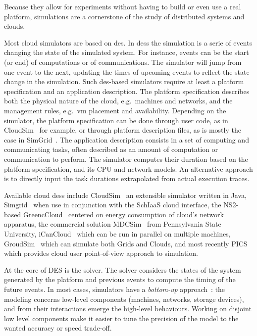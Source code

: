 \documentclass[10pt,conference,compsocconf]{IEEEtran}
\begin{document}
Because they allow for experiments without having to build or even use a real 
platform, simulations are a cornerstone of the study of distributed
systems and clouds.  

Most cloud simulators  are based on \ac{des}. In \aclp{des}  the simulation is a
serie  of events  changing the  state of  the simulated  system.  For  instance,
events can  be the  start (or  end) of computations  or of  communications.  The
simulator will jump from  one event to the next, updating  the times of upcoming
events  to reflect  the state  change  in the  simulation.  Such  \ac{des}-based
simulators  require  at  least  a  platform  specification  and  an  application
description.  The platform  specification describes both the  physical nature of
the cloud,  e.g.~machines and networks,  and the management  rules, e.g.~\ac{vm}
placement  and   availability.   Depending   on  the  simulator,   the  platform
specification can be done through  user code, as in CloudSim~\cite{cloudsim} for
example,  or through  platform  description  files, as  is  mostly  the case  in
SimGrid~\cite{simgrid}.   The  application  description  consists in  a  set  of
computing and communicating  tasks, often described as an  amount of computation
or communication to perform. The simulator  computes their duration based on the
platform specification, and its CPU and network models.  An alternative approach
is  to directly  input the  task  durations extrapolated  from actual  execution
traces.


Available cloud \acp{des} include CloudSim~\cite{cloudsim} an extensible
simulator written in Java, Simgrid~\cite{simgrid} when use in conjunction with
the SchIaaS cloud interface, the NS2-based GreencCloud~\cite{greencloud} centered
on energy consumption of cloud's network apparatus, the commercial solution
MDCSim~\cite{MDCSim} from Pennsylvania State University,
iCanCloud~\cite{iCanCloud} which can be run in parallel on multiple machines,
GroudSim~\cite{groudsim} which can simulate both Grids and Clouds, and
most recently PICS~\cite{pics} which provides cloud user point-of-view approach to
simulation.

At the core of DES is the solver.  The solver considers the states of the system
generated  by the  platform and  previous events  to compute  the timing  of the
future events. %
In  most  cases, simulators  have  a  \emph{bottom-up} approach~:  the  modeling
concerns low-level  components (machines,  networks, storage devices),  and from
their interactions  emerge the high-level  behaviours. Working on  disjoint low
level components make it easier to tune the precision of the model to the wanted
accuracy or speed trade-off.
\end{document}
